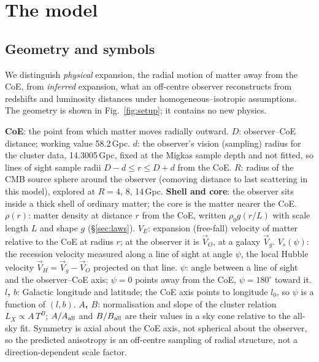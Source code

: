 \documentclass[10pt,twocolumn]{article}
\begin{document}
\section{The model}\label{sec:model}
\subsection{Geometry and symbols}
We distinguish \emph{physical} expansion, the radial motion of matter away from the CoE, from \emph{inferred} expansion, what an off-centre observer reconstructs from redshifts and luminosity distances under homogeneous--isotropic assumptions. The geometry is shown in Fig.~\ref{fig:setup}; it contains no new physics.

\textbf{CoE}: the point from which matter moves radially outward.
\textbf{$D$}: observer--CoE distance; working value 58.2\,Gpc.
\textbf{$d$}: the observer's vision (sampling) radius for the cluster data, 14.3005\,Gpc, fixed at the Migkas sample depth and not fitted, so lines of sight sample radii $D-d\le r\le D+d$ from the CoE.
\textbf{$R$}: radius of the CMB source sphere around the observer (comoving distance to last scattering in this model), explored at $R=4$, 8, 14\,Gpc.
\textbf{Shell and core}: the observer sits inside a thick shell of ordinary matter; the core is the matter nearer the CoE.
\textbf{$\rho(r)$}: matter density at distance $r$ from the CoE, written $\rho_0g(r/L)$ with scale length $L$ and shape $g$ (\S\ref{sec:laws}).
\textbf{$V_E$}: expansion (free-fall) velocity of matter relative to the CoE at radius $r$; at the observer it is $\vec V_O$, at a galaxy $\vec V_g$.
\textbf{$V_s(\psi)$}: the recession velocity measured along a line of sight at angle $\psi$, the local Hubble velocity $\vec V_H=\vec V_g-\vec V_O$ projected on that line.
\textbf{$\psi$}: angle between a line of sight and the observer--CoE axis; $\psi=0$ points away from the CoE, $\psi=180^\circ$ toward it.
\textbf{$l$, $b$}: Galactic longitude and latitude; the CoE axis points to longitude $l_0$, so $\psi$ is a function of $(l,b)$.
\textbf{$A$, $B$}: normalisation and slope of the cluster relation $L_X\propto A\,T^{B}$; $A/A_{\rm all}$ and $B/B_{\rm all}$ are their values in a sky cone relative to the all-sky fit.
Symmetry is axial about the CoE axis, not spherical about the observer, so the predicted anisotropy is an off-centre sampling of radial structure, not a direction-dependent scale factor.
\end{document}
